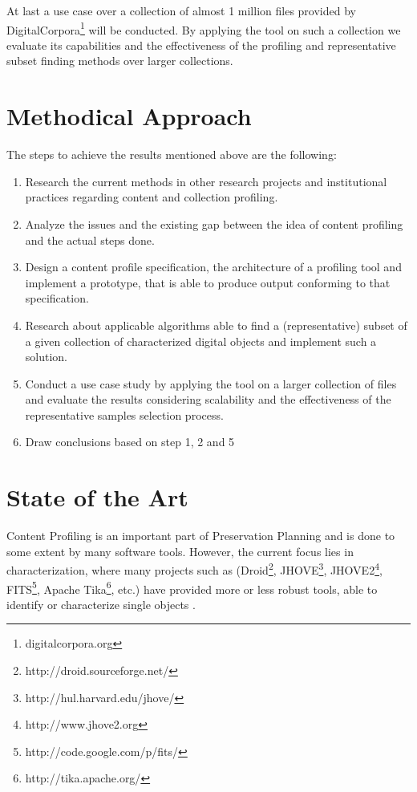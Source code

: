\documentclass[a4paper,12pt]{scrartcl} %
\begin{document}
At last a use case over a collection of almost 1 million files provided by DigitalCorpora\footnote{digitalcorpora.org} will be conducted. By applying the tool on such a collection we evaluate its capabilities and the effectiveness of the profiling and representative subset finding methods over larger collections.

\section*{Methodical Approach}
The steps to achieve the results mentioned above are the following:
\begin{enumerate}[itemsep=2pt, parsep=2pt]
\item Research the current methods in other research projects and institutional practices regarding content and collection profiling.
\item Analyze the issues and the existing gap between the idea of content profiling and the actual steps done.
\item Design a content profile specification, the architecture of a profiling tool and implement a prototype, that is able to produce output conforming to that specification.
\item Research about applicable algorithms able to find a (representative) subset of a given collection of characterized digital objects and implement such a solution.
\item Conduct a use case study by applying the tool on a larger collection of files and evaluate the results considering scalability and the effectiveness of the representative samples selection process.
\item Draw conclusions based on step 1, 2 and 5
\end{enumerate}

\section*{State of the Art}
Content Profiling is an important part of Preservation Planning and is done to some extent by many software tools. However, the current focus lies in characterization, where many projects such as (Droid\footnote{http://droid.sourceforge.net/}, JHOVE\footnote{http://hul.harvard.edu/jhove/}, JHOVE2\footnote{http://www.jhove2.org}, FITS\footnote{http://code.google.com/p/fits/}, Apache Tika\footnote{http://tika.apache.org/}, etc.) have provided more or less robust tools, able to identify or characterize single objects \cite{Knijff:2011it}. 
\end{document}
